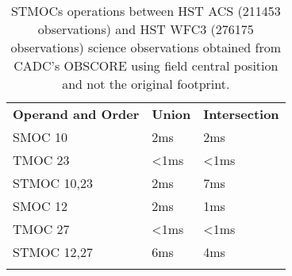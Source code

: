 \begin{table}[!htbp]
\begin{center}
{\scriptsize
\begin{tabular}{p{}p{}p{}}
\sptablerule
\textbf{Operand and Order} & \textbf{Union} & \textbf{Intersection} \\
\sptablerule
SMOC 10	&2ms&	2ms \\
TMOC 23&	<1ms&	<1ms \\
STMOC 10,23&	2ms&	7ms \\
SMOC 12&	2ms&	1ms \\
TMOC 27&	<1ms&	<1ms \\
STMOC 12,27&	6ms&	4ms \\
\sptablerule
\end{tabular}
\caption[STMOC operation performances]{STMOCs operations between HST ACS (211453 observations) and HST WFC3 (276175 observations) science observations obtained from CADC's OBSCORE using field central position and not the original footprint.}
\normalsize
}
\label{table:tmocsizeacs}
\end{center}
\end{table}

